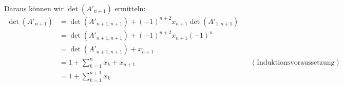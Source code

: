 \documentclass[a4paper,12pt]{article}
\begin{document}
Daraus können wir $\det(A'_{n+1})$ ermitteln:
\begin{align*}
\det(A'_{n+1}) &= \det(A'_{n+1,n+1}) + (-1)^{n+2} x_{n+1} \det(A'_{1,n+1}) \\
               &= \det(A'_{n+1,n+1}) + (-1)^{n+2} x_{n+1} (-1)^{n} \\
               &= \det(A'_{n+1,n+1}) + x_{n+1} \\
               &= 1 + \sum_{k=1}^{n} x_k + x_{n+1} && (\text{Induktionsvoraussetzung}) \\
               &= 1 + \sum_{k=1}^{n+1} x_k
\end{align*}
\end{document}
